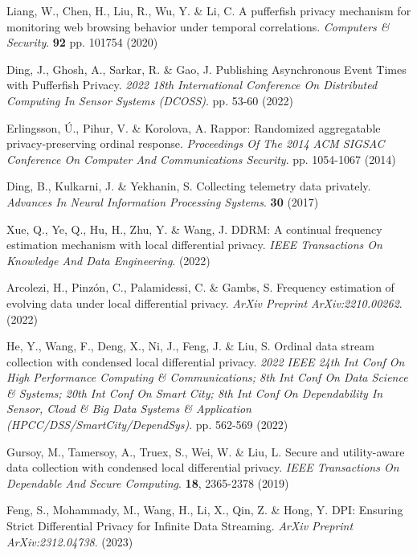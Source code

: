 \begin{thebibliography}{10}
\begin{small}

Liang, W., Chen, H., Liu, R., Wu, Y. \& Li, C. A pufferfish privacy mechanism for monitoring web browsing behavior under temporal correlations. {\em Computers \& Security}. \textbf{92} pp. 101754 (2020)

		
Ding, J., Ghosh, A., Sarkar, R. \& Gao, J. Publishing Asynchronous Event Times with Pufferfish Privacy. {\em 2022 18th International Conference On Distributed Computing In Sensor Systems (DCOSS)}. pp. 53-60 (2022)

Erlingsson, Ú., Pihur, V. \& Korolova, A. Rappor: Randomized aggregatable privacy-preserving ordinal response. {\em Proceedings Of The 2014 ACM SIGSAC Conference On Computer And Communications Security}. pp. 1054-1067 (2014)

Ding, B., Kulkarni, J. \& Yekhanin, S. Collecting telemetry data privately. {\em Advances In Neural Information Processing Systems}. \textbf{30} (2017)

Xue, Q., Ye, Q., Hu, H., Zhu, Y. \& Wang, J. DDRM: A continual frequency estimation mechanism with local differential privacy. {\em IEEE Transactions On Knowledge And Data Engineering}. (2022)

Arcolezi, H., Pinzón, C., Palamidessi, C. \& Gambs, S. Frequency estimation of evolving data under local differential privacy. {\em ArXiv Preprint ArXiv:2210.00262}. (2022)

He, Y., Wang, F., Deng, X., Ni, J., Feng, J. \& Liu, S. Ordinal data stream collection with condensed local differential privacy. {\em 2022 IEEE 24th Int Conf On High Performance Computing \& Communications; 8th Int Conf On Data Science \& Systems; 20th Int Conf On Smart City; 8th Int Conf On Dependability In Sensor, Cloud \& Big Data Systems \& Application (HPCC/DSS/SmartCity/DependSys)}. pp. 562-569 (2022)

Gursoy, M., Tamersoy, A., Truex, S., Wei, W. \& Liu, L. Secure and utility-aware data collection with condensed local differential privacy. {\em IEEE Transactions On Dependable And Secure Computing}. \textbf{18}, 2365-2378 (2019)

Feng, S., Mohammady, M., Wang, H., Li, X., Qin, Z. \& Hong, Y. DPI: Ensuring Strict Differential Privacy for Infinite Data Streaming. {\em ArXiv Preprint ArXiv:2312.04738}. (2023)


\end{small}
\end{thebibliography}
